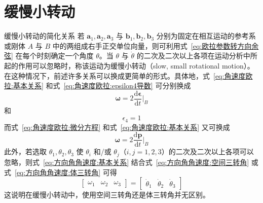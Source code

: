 \section{缓慢小转动}\label{sec:slow-small-rotation}
\begin{myTheorem}{缓慢小转动的简化关系}
若 $\mathbf{a}_1,\mathbf{a}_2,\mathbf{a}_3$ 与 $\mathbf{b}_1,\mathbf{b}_2,\mathbf{b}_3$ 分别为固定在相互运动的参考系或刚体 $A$ 与 $B$ 中的两组成右手正交单位向量，则可利用式~\eqref{eq:欧拉参数转方向余弦} 在每个时刻确定一个角度 $\theta$。当 $\theta$ 与 $\dot{\theta}$ 的二次及二次以上各项在运动分析中所起的作用可以忽略时，称该运动为缓慢小转动（slow, small rotational motion）。在这种情况下，前述许多关系可以换成更简单的形式。具体地，式~\eqref{eq:角速度欧拉:基本关系} 和式~\eqref{eq:角速度欧拉:epsilon4导数} 可分别换成
\begin{equation}
    \bm{\omega} = 2\frac{\mathrm{d}\bm{\epsilon}}{\mathrm{d}t}\Big|_{B}
    \label{eq:缓慢小转动:omega}
\end{equation}
和
\begin{equation}
    \epsilon_4 = 1
    \label{eq:缓慢小转动:epsilon4}
\end{equation}
而式~\eqref{eq:角速度欧拉:微分方程} 和式~\eqref{eq:角速度欧拉:基本关系} 又可换成
\begin{equation}
    \bm{\omega} = 2\frac{\mathrm{d}\bm{p}}{\mathrm{d}t}\Big|_{B}
    \label{eq:缓慢小转动:omega_p}
\end{equation}
此外，若选取 $\theta_1,\theta_2,\theta_3$ 使 $\theta_i$ 和/或 $\theta_j$（$i,j=1,2,3$）的二次及二次以上各项可以忽略，则式~\eqref{eq:方向角角速度:基本关系} 结合式~\eqref{eq:方向角角速度:空间三转角} 或式~\eqref{eq:方向角角速度:体三转角} 可得
\begin{equation}
    \begin{bmatrix}\omega_1 & \omega_2 & \omega_3\end{bmatrix}
    = \begin{bmatrix}\dot{\theta}_1 & \dot{\theta}_2 & \dot{\theta}_3\end{bmatrix}
    \label{eq:缓慢小转动:方向角}
\end{equation}
这说明在缓慢小转动中，使用空间三转角还是体三转角并无区别。
\end{myTheorem}

